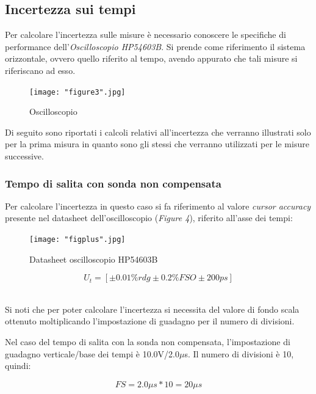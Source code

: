 \documentclass[a4paper]{article}
\begin{document}
\subsection {Incertezza sui tempi}

Per calcolare l'incertezza sulle misure è necessario conoscere le specifiche di performance dell'\emph{Oscilloscopio HP54603B}. Si prende come riferimento il sistema orizzontale, ovvero quello riferito al tempo, avendo appurato che tali misure si riferiscano ad esso.

\begin{figure}[htp]
	\centering
	\texttt{[image: "figure3".jpg]}
	\caption{Oscilloscopio}
	\label{}
\end{figure}

Di seguito sono riportati i calcoli relativi all'incertezza che verranno illustrati solo per la prima misura in quanto sono gli stessi che verranno utilizzati per le misure successive.

\subsubsection{Tempo di salita con sonda non compensata}

Per calcolare l'incertezza in questo caso si fa riferimento al valore \emph{cursor accuracy} presente nel datasheet dell'oscilloscopio (\emph{Figure 4}), riferito all'asse dei tempi:

\begin{figure}[htp]
	\centering
	\texttt{[image: "figplus".jpg]}
	\caption{Datasheet oscilloscopio HP54603B}
	\label{}
\end{figure}


\begin{Large}
	\begin{equation}
  		U_{t}=[\pm 0.01\%rdg\pm 0.2\%FSO \pm 200ps]
	\end{equation}
\end{Large}\\

Si noti che per poter calcolare l'incertezza si necessita del valore di fondo scala ottenuto moltiplicando l'impostazione di guadagno per il numero di divisioni.

Nel caso del tempo di salita con la sonda non compensata, l'impostazione di guadagno verticale/base dei tempi è 10.0V/2.0$\mu$s.
Il numero di divisioni è 10, quindi:
\begin{Large}
	\begin{equation}
  		FS=2.0\mu s * 10= 20\mu s
	\end{equation}
\end{Large}\\
\end{document}
